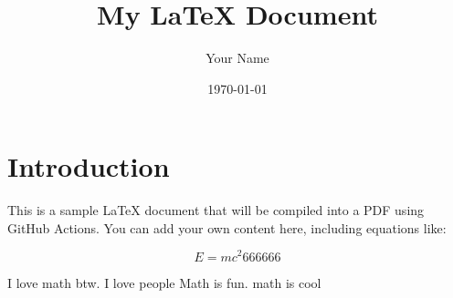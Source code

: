 \documentclass[a4paper,12pt]{article}
\begin{document}
\title{My LaTeX Document}
\author{Your Name}
\date{\today}
\maketitle

\section{Introduction}
This is a sample LaTeX document that will be compiled into a PDF using GitHub Actions. You can add your own content here, including equations like:

\begin{equation}
E = mc^2 666666
\end{equation}

I love math btw. I love people
Math is fun.
math is cool
\end{document}
